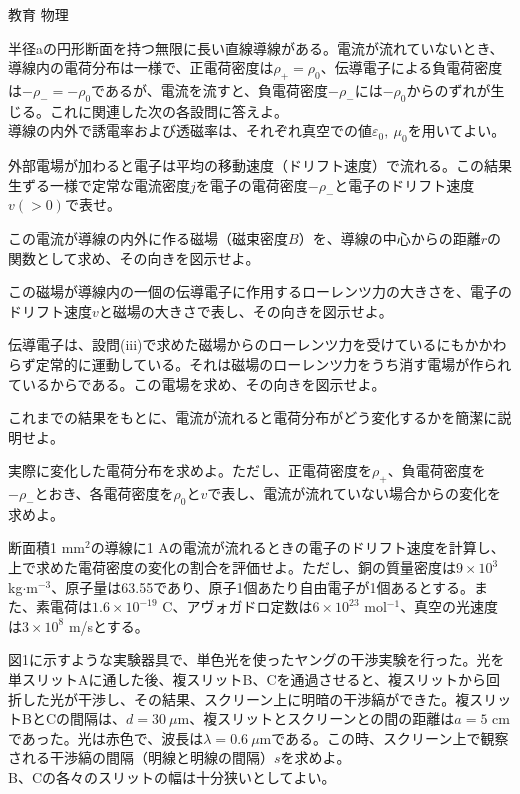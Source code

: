 \documentclass[fleqn]{jbook}
\begin{document}
\begin{question}{教育 物理}{}
\begin{subquestions}
\begin{subsubquestions}
\end{subsubquestions}

\SubQuestion
半径aの円形断面を持つ無限に長い直線導線がある。電流が流れていないとき、導線内の電荷分布は一様で、正電荷密度は$\rho_+=\rho_0$、伝導電子による負電荷密度は$-\rho_-=-\rho_0$であるが、電流を流すと、負電荷密度$-\rho_-$には$-\rho_0$からのずれが生じる。これに関連した次の各設問に答えよ。\\
導線の内外で誘電率および透磁率は、それぞれ真空での値$\varepsilon_0,\ \mu_0$を用いてよい。

\begin{subsubquestions}
\SubSubQuestion
外部電場が加わると電子は平均の移動速度（ドリフト速度）で流れる。この結果生ずる一様で定常な電流密度$j$を電子の電荷密度$-\rho_-$と電子のドリフト速度$v(>0)$で表せ。

\SubSubQuestion
この電流が導線の内外に作る磁場（磁束密度$B$）を、導線の中心からの距離$r$の関数として求め、その向きを図示せよ。

\SubSubQuestion
この磁場が導線内の一個の伝導電子に作用するローレンツ力の大きさを、電子のドリフト速度$v$と磁場の大きさで表し、その向きを図示せよ。

\SubSubQuestion
伝導電子は、設問(iii)で求めた磁場からのローレンツ力を受けているにもかかわらず定常的に運動している。それは磁場のローレンツ力をうち消す電場が作られているからである。この電場を求め、その向きを図示せよ。

\SubSubQuestion
これまでの結果をもとに、電流が流れると電荷分布がどう変化するかを簡潔に説明せよ。

\SubSubQuestion
実際に変化した電荷分布を求めよ。ただし、正電荷密度を$\rho_+$、負電荷密度を$-\rho_-$とおき、各電荷密度を$\rho_0$と$v$で表し、電流が流れていない場合からの変化を求めよ。

\SubSubQuestion
断面積1 mm$^2$の導線に1 Aの電流が流れるときの電子のドリフト速度を計算し、上で求めた電荷密度の変化の割合を評価せよ。ただし、銅の質量密度は$9\times 10^3$ kg$\cdot$m$^{-3}$、原子量は63.55であり、原子1個あたり自由電子が1個あるとする。また、素電荷は$1.6\times 10^{-19}$ C、アヴォガドロ定数は$6\times 10^{23}$ mol$^{-1}$、真空の光速度は$3\times 10^8$ m/sとする。

\end{subsubquestions}

\SubQuestion
\begin{subsubquestions}
\SubSubQuestion
図1に示すような実験器具で、単色光を使ったヤングの干渉実験を行った。光を単スリットAに通した後、複スリットB、Cを通過させると、複スリットから回折した光が干渉し、その結果、スクリーン上に明暗の干渉縞ができた。複スリットBとCの間隔は、$d=30\ \mu$m、複スリットとスクリーンとの間の距離は$a=5$ cmであった。光は赤色で、波長は$\lambda=0.6\ \mu$mである。この時、スクリーン上で観察される干渉縞の間隔（明線と明線の間隔）$s$を求めよ。\\
B、Cの各々のスリットの幅は十分狭いとしてよい。


\end{subsubquestions}
\end{subquestions}
\end{question}
\end{document}
